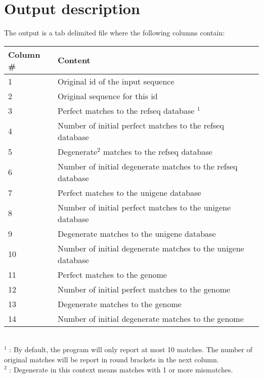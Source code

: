 \documentclass[a4paper,12pt]{article}
\begin{document}
 



\section{Output description}
\label{sec:outformat}

The output is a tab delimited file where the following columns contain: \\
\begin{tabular}{ll}
\hline
Column \# & Content \\
\hline
1 & Original id of the input sequence \\
2 & Original sequence for this id \\
3 & Perfect matches to the refseq database $^1$ \\
4 & Number of initial perfect matches to the refseq database \\
5 & Degenerate$^2$ matches to the refseq database  \\
6 & Number of initial degenerate matches to the refseq database \\
7 & Perfect matches to the unigene database  \\
8 & Number of initial perfect matches to the unigene database \\
9 & Degenerate matches to the unigene database  \\
10 & Number of initial degenerate matches to the unigene database \\
11 & Perfect matches to the genome  \\
12 & Number of initial perfect matches to the genome \\
13 & Degenerate matches to the genome  \\
14 & Number of initial degenerate matches to the genome \\
\hline
\end{tabular}
\\
$^1$ : By default, the program will only report at most 10 matches. The number of original matches will be report in round brackets in the next column. \\
$^2$ : Degenerate in this context means matches with 1 or more mismatches.
\end{document}
